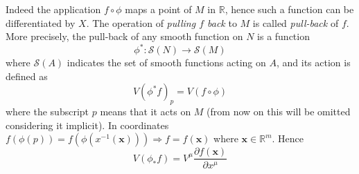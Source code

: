 \documentclass{article}
\begin{document}
Indeed the application $f \circ \phi$ maps a point of $M$ in $\mathbb{R}$, hence such a function can be differentiated by $X$. The operation of \emph{pulling $f$ back} to $M$ is called \emph{pull-back} of $f$. 
More precisely, the pull-back of any smooth function on $N$ is a function
\begin{equation*}
    \phi^* : \mathcal{S}(N) \to \mathcal{S}(M)
\end{equation*}
where $\mathcal{S}(A)$ indicates the set of smooth functions acting on $A$, and its action is defined as
\begin{equation*}
    V(\phi^* f)_p = V(f \circ \phi)
\end{equation*}
where the subscript $p$ means that it acts on $M$ (from now on this will be omitted considering it implicit).
In coordinates $f(\phi(p)) = f(\phi(x^{-1}(\mathbf{x}))) \Rightarrow f = f(\mathbf{x})$ where $\mathbf{x} \in \mathbb{R}^m$. Hence
\begin{equation*}
    V(\phi_*f) = V^\mu \frac{\partial f(\mathbf{x})}{\partial x^\mu}
\end{equation*}
\end{document}
